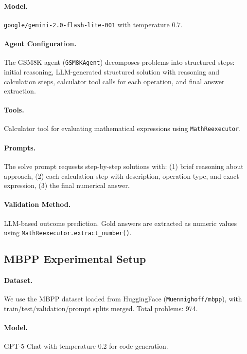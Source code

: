 \documentclass{article}
\theoremstyle{plain}
\theoremstyle{definition}
\theoremstyle{remark}
\begin{document}
\paragraph{Model.}
\texttt{google/gemini-2.0-flash-lite-001} with temperature 0.7.

\paragraph{Agent Configuration.}
The GSM8K agent (\texttt{GSM8KAgent}) decomposes problems into structured steps: initial reasoning, LLM-generated structured solution with reasoning and calculation steps, calculator tool calls for each operation, and final answer extraction.

\paragraph{Tools.}
Calculator tool for evaluating mathematical expressions using \texttt{MathReexecutor}.

\paragraph{Prompts.}
The solve prompt requests step-by-step solutions with: (1) brief reasoning about approach, (2) each calculation step with description, operation type, and exact expression, (3) the final numerical answer.

\paragraph{Validation Method.}
LLM-based outcome prediction. Gold answers are extracted as numeric values using \texttt{MathReexecutor.extract\_number()}.

\subsection{MBPP Experimental Setup}

\paragraph{Dataset.}
We use the MBPP dataset \cite{austin2021program} loaded from HuggingFace (\texttt{Muennighoff/mbpp}), with train/test/validation/prompt splits merged. Total problems: 974.

\paragraph{Model.}
GPT-5 Chat with temperature 0.2 for code generation.
\end{document}
